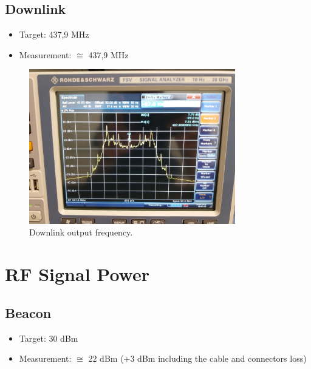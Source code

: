\documentclass[12pt]{book}
\begin{document}
\subsection{Downlink}

\begin{itemize}
    \item Target: 437,9 MHz
    \item Measurement: $\cong$ 437,9 MHz
\end{itemize}

\begin{figure}[H]
    \begin{center}
        \includegraphics[width=0.8\textwidth]{figures/tests/downlink_frequency.jpg}
        \caption{Downlink output frequency.}
        \label{fig:downlink-frequency}
    \end{center}
\end{figure}

\section{RF Signal Power}

\subsection{Beacon}

\begin{itemize}
    \item Target: 30 dBm
    \item Measurement: $\cong$ 22 dBm (+3 dBm including the cable and connectors loss)
\end{itemize}
\end{document}
